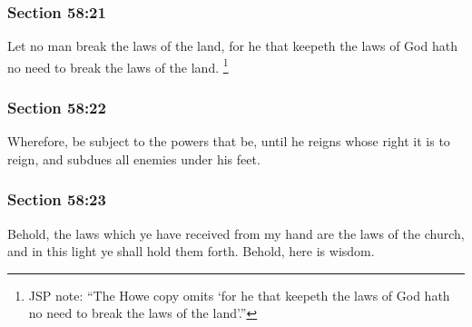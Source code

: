 	\subsubsection{Section 58:21} %
		\label{DC58-21}

		Let no man break the laws of the land, for he that keepeth the laws of God hath no need to break the laws of the land.%
			\footnote{%
				JSP note: ``The Howe copy omits `for he that keepeth the laws of God hath no need to break the laws of the land'.''
				}


	\subsubsection{Section 58:22} %
		\label{DC58-22}

		Wherefore, be subject to the powers that be, until he reigns whose right it is to reign, and subdues all enemies under his feet.


	\subsubsection{Section 58:23} %
		\label{DC58-23}

		Behold, the laws which ye have received from my hand are the laws of the church, and in this light ye shall hold them forth. Behold, here is wisdom.


